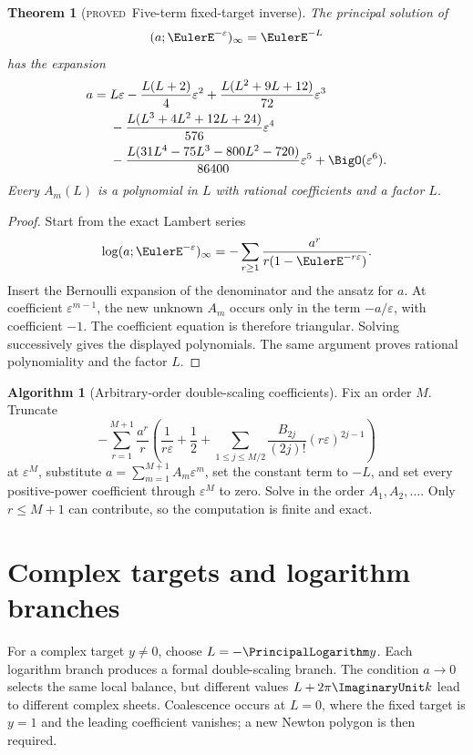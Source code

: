\documentclass[11pt,letterpaper,oneside,openany]{book}
\newtheorem{theorem}{Theorem}[chapter]
\theoremstyle{definition}
\newtheorem{algorithm}{Algorithm}[chapter]
\theoremstyle{remark}
\newcommand{\statusproved}{\textcolor{provedgreen}{\textsc{proved}}}
\begin{document}
\begin{theorem}[\statusproved\ Five-term fixed-target inverse]
The principal solution of
\[
 (a;\EulerE^{-\varepsilon})_\infty=\EulerE^{-L}
\]
has the expansion
\begin{align}
 a={}&L\varepsilon-
 \frac{L(L+2)}4\varepsilon^2
 +\frac{L(L^2+9L+12)}{72}\varepsilon^3 \notag \\
 &-\frac{L(L^3+4L^2+12L+24)}{576}\varepsilon^4 \notag \\
 &-\frac{L(31L^4-75L^3-800L^2-720)}{86400}\varepsilon^5
 +\BigO(\varepsilon^6).
 \label{eq:double-scaling-five}
\end{align}
Every \(A_m(L)\) is a polynomial in \(L\) with rational coefficients and a
factor \(L\).
\end{theorem}
\begin{proof}
Start from the exact Lambert series
\[
 \log(a;\EulerE^{-\varepsilon})_\infty
 =-\sum_{r\ge1}\frac{a^r}{r(1-\EulerE^{-r\varepsilon})}.
\]
Insert the Bernoulli expansion of the denominator and the ansatz for \(a\).
At coefficient \(\varepsilon^{m-1}\), the new unknown \(A_m\) occurs only in
the term \(-a/\varepsilon\), with coefficient \(-1\).  The coefficient
equation is therefore triangular.  Solving successively gives the displayed
polynomials.  The same argument proves rational polynomiality and the factor
\(L\).
\end{proof}

\begin{algorithm}[Arbitrary-order double-scaling coefficients]
Fix an order \(M\).  Truncate
\[
 -\sum_{r=1}^{M+1}\frac{a^r}{r}
 \left(\frac1{r\varepsilon}+\frac12+
 \sum_{1\le j\le M/2}\frac{B_{2j}}{(2j)!}
 (r\varepsilon)^{2j-1}\right)
\]
at \(\varepsilon^M\), substitute
\(a=\sum_{m=1}^{M+1}A_m\varepsilon^m\), set the constant term to \(-L\), and
set every positive-power coefficient through \(\varepsilon^M\) to zero.  Solve
in the order \(A_1,A_2,\ldots\).  Only \(r\le M+1\) can contribute, so the
computation is finite and exact.
\end{algorithm}

\section{Complex targets and logarithm branches}
For a complex target \(y\ne0\), choose \(L=-\PrincipalLogarithm y\).  Each logarithm branch
produces a formal double-scaling branch.  The condition \(a\to0\) selects the
same local balance, but different values \(L+2\pi\ImaginaryUnit k\) lead to different
complex sheets.  Coalescence occurs at \(L=0\), where the fixed target is
\(y=1\) and the leading coefficient vanishes; a new Newton polygon is then
required.
\end{document}
